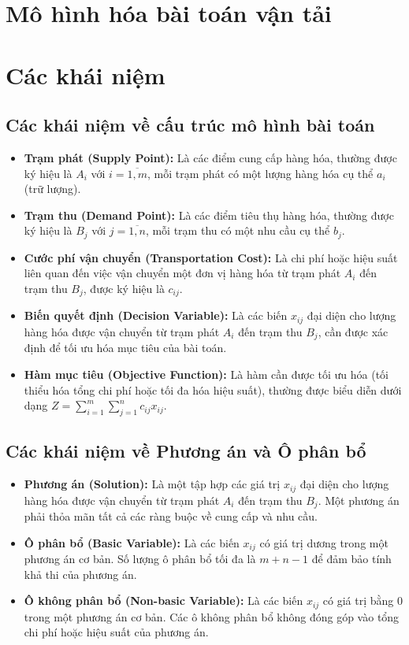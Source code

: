 
\section{Mô hình hóa bài toán vận tải}
    

\section{Các khái niệm}
\subsection{Các khái niệm về cấu trúc mô hình bài toán}
\begin{itemize}
    \item \textbf{Trạm phát (Supply Point):} Là các điểm cung cấp hàng hóa, thường được ký hiệu là $A_i$ với $i = \overline{1,m}$, mỗi trạm phát có một lượng hàng hóa cụ thể $a_i$ (trữ lượng).
    \item \textbf{Trạm thu (Demand Point):} Là các điểm tiêu thụ hàng hóa, thường được ký hiệu là $B_j$ với $j = \overline{1,n}$, mỗi trạm thu có một nhu cầu cụ thể $b_j$.
    \item \textbf{Cước phí vận chuyển (Transportation Cost):} Là chi phí hoặc hiệu suất liên quan đến việc vận chuyển một đơn vị hàng hóa từ trạm phát $A_i$ đến trạm thu $B_j$, được ký hiệu là $c_{ij}$.
    \item \textbf{Biến quyết định (Decision Variable):} Là các biến $x_{ij}$ đại diện cho lượng hàng hóa được vận chuyển từ trạm phát $A_i$ đến trạm thu $B_j$, cần được xác định để tối ưu hóa mục tiêu của bài toán.
    \item \textbf{Hàm mục tiêu (Objective Function):} Là hàm cần được tối ưu hóa (tối thiểu hóa tổng chi phí hoặc tối đa hóa hiệu suất), thường được biểu diễn dưới dạng $Z = \sum_{i=1}^{m} \sum_{j=1}^{n} c_{ij} x_{ij}$.
\end{itemize}
\subsection{Các khái niệm về Phương án và Ô phân bổ}
\begin{itemize}
    \item \textbf{Phương án (Solution):} Là một tập hợp các giá trị $x_{ij}$ đại diện cho lượng hàng hóa được vận chuyển từ trạm phát $A_i$ đến trạm thu $B_j$. Một phương án phải thỏa mãn tất cả các ràng buộc về cung cấp và nhu cầu.
    \item \textbf{Ô phân bổ (Basic Variable):} Là các biến $x_{ij}$ có giá trị dương trong một phương án cơ bản. Số lượng ô phân bổ tối đa là $m + n - 1$ để đảm bảo tính khả thi của phương án.
    \item \textbf{Ô không phân bổ (Non-basic Variable):} Là các biến $x_{ij}$ có giá trị bằng 0 trong một phương án cơ bản. Các ô không phân bổ không đóng góp vào tổng chi phí hoặc hiệu suất của phương án.
\end{itemize}


